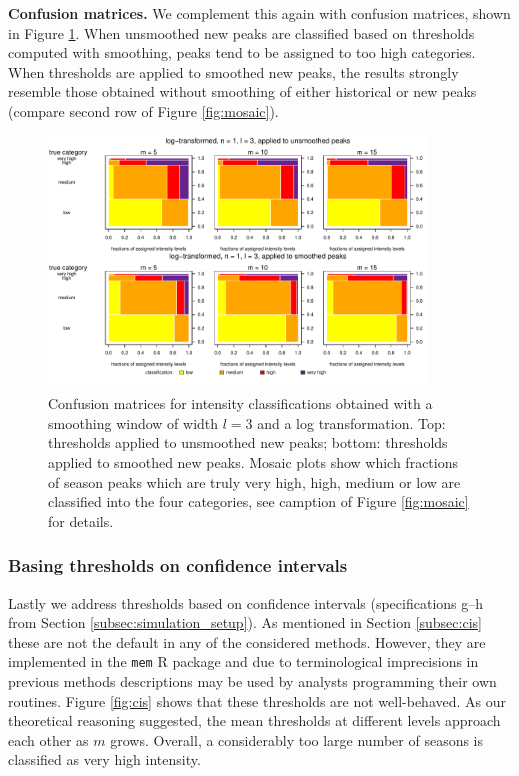 \documentclass{article}
\begin{document}
\textbf{Confusion matrices.} We complement this again with confusion matrices, shown in Figure \ref{fig:mosaic_smoothing}. When unsmoothed new peaks are classified based on thresholds computed with smoothing, peaks tend to be assigned to too high categories. When thresholds are applied to smoothed new peaks, the results strongly resemble those obtained without smoothing of either historical or new peaks (compare second row of Figure \ref{fig:mosaic}).


\begin{figure}[h!]
\begin{center}
\includegraphics[width=0.9\textwidth]{figure/mosaic_log_smoothed_fr.pdf}
\caption{Confusion matrices for intensity classifications obtained with a smoothing window of width $l = 3$ and a log transformation. Top: thresholds applied to unsmoothed new peaks; bottom: thresholds applied to smoothed new peaks. Mosaic plots show which fractions of season peaks which are truly very high, high, medium or low are classified into the four categories, see camption of Figure \ref{fig:mosaic} for details.}
\label{fig:mosaic_smoothing}
\end{center}
\end{figure}


\subsubsection{Basing thresholds on confidence intervals}

Lastly we address thresholds based on confidence intervals (specifications g--h from Section \ref{subsec:simulation_setup}). As mentioned in Section \ref{subsec:cis} these are not the default in any of the  considered methods. However, they are implemented in the \texttt{mem} R package and due to terminological imprecisions in previous methods descriptions may be used by analysts programming their own routines. Figure \ref{fig:cis} shows that these thresholds are not well-behaved. As our theoretical reasoning suggested, the mean thresholds at different levels approach each other as $m$ grows. Overall, a considerably too large number of seasons is classified as very high intensity.
\end{document}
